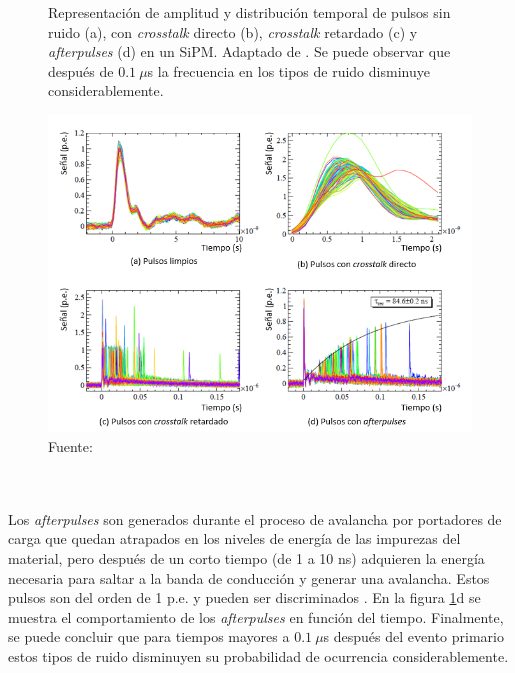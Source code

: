 \begin{figure}[h!]
\begin{centering}
    \caption{Representación de amplitud y distribución temporal de pulsos sin ruido (a), con \textit{crosstalk} directo (b), \textit{crosstalk} retardado (c)  y \textit{afterpulses} (d) en un SiPM. Adaptado de \citep{charct_noise}. Se puede observar que después de  $0.1~\mu$s la frecuencia en los tipos de ruido disminuye considerablemente.}
    \includegraphics[width=\textwidth]{Images/Pulses_with_noise.PNG}
    \caption*{Fuente:}
    \label{fig:noise}  
  \par\end{centering}
\end{figure}
\\ \\
Los \textit{afterpulses} son generados durante el proceso de avalancha por portadores de carga que quedan atrapados en los niveles de energía de las impurezas  del material, pero después de un corto tiempo  (de 1 a 10 ns) adquieren la energía necesaria para saltar a la banda de conducción y generar una avalancha. Estos pulsos son del orden de 1 p.e. y pueden ser discriminados \citep{MPPC_note}. En la figura   \ref{fig:noise}d se muestra el comportamiento de los \textit{afterpulses} en función del tiempo. Finalmente, se puede concluir que para tiempos mayores a $0.1~\mu$s después del evento primario estos tipos de ruido disminuyen su probabilidad de ocurrencia considerablemente.       
